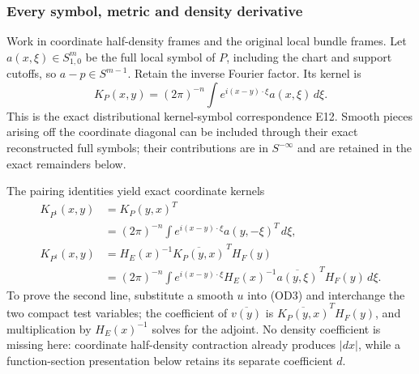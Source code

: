 \documentclass[
  11pt,
]{article}
\makeatletter
\let\ReaderOriginalAnchorStart\hyper@anchorstart
\let\ReaderOriginalAnchorEnd\hyper@anchorend
\let\ReaderPendingAliases\@empty
\def\ReaderArmAliases#1{\gdef\ReaderPendingAliases{#1}}
\def\hyper@anchorstart#1{\ReaderIfNativeAnchorTF{#1}{\ReaderPendingAliases\global\let\ReaderPendingAliases\@empty}{}\ReaderOriginalAnchorStart{#1}}
\makeatother
\begin{document}
\ReaderArmAliases{\ReaderOriginalAnchorStart{every-symbol-metric-and-density-derivative}\ReaderOriginalAnchorEnd}
\subsubsection{Every symbol, metric and density
derivative}\label{every-symbol-metric-and-density-derivative}

Work in coordinate half-density frames and the original local bundle
frames. Let \(a(x,\xi)\in S^m_{1,0}\) be the full local symbol of \(P\),
including the chart and support cutoffs, so \(a-p\in S^{m-1}\). Retain
the inverse Fourier factor. Its kernel is \[
K_P(x,y)=(2\pi)^{-n}\int e^{i(x-y)\cdot\xi}a(x,\xi)\,d\xi.
\tag{OA1}
\] This is the exact distributional kernel-symbol correspondence E12.
Smooth pieces arising off the coordinate diagonal can be included
through their exact reconstructed full symbols; their contributions are
in \(S^{-\infty}\) and are retained in the exact remainders below.

The pairing identities yield exact coordinate kernels \[
\begin{aligned}
K_{P^{\mathrm t}}(x,y)&=K_P(y,x)^T\\
 &=(2\pi)^{-n}\int e^{i(x-y)\cdot\xi}a(y,-\xi)^T\,d\xi,\\
K_{P^\dagger}(x,y)&=H_E(x)^{-1}\overline{K_P(y,x)}^{\,T}H_F(y)\\
 &=(2\pi)^{-n}\int e^{i(x-y)\cdot\xi}
 H_E(x)^{-1}\overline{a(y,\xi)}^{\,T}H_F(y)\,d\xi.
\end{aligned}
\tag{OA2}
\] To prove the second line, substitute a smooth \(u\) into (OD3) and
interchange the two compact test variables; the coefficient of
\(\overline{v(y)}\) is \(\overline{K_P(y,x)}^TH_F(y)\), and
multiplication by \(H_E(x)^{-1}\) solves for the adjoint. No density
coefficient is missing here: coordinate half-density contraction already
produces \(|dx|\), while a function-section presentation below retains
its separate coefficient \(d\).
\end{document}
